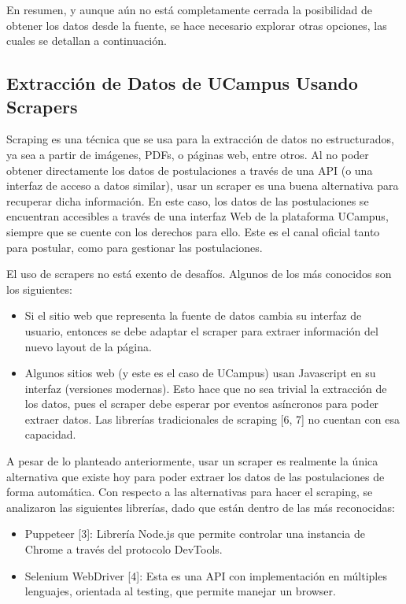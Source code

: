 En resumen, y aunque aún no está completamente cerrada la posibilidad de obtener
los datos desde la fuente, se hace necesario explorar otras opciones, las cuales
se detallan a continuación.

\subsection{Extracción de Datos de UCampus Usando Scrapers}

Scraping es una técnica que se usa para la extracción de datos no estructurados,
ya sea a partir de imágenes, PDFs, o páginas web, entre otros. Al no poder
obtener directamente los datos de postulaciones a través de una API (o una
interfaz de acceso a datos similar), usar un scraper es una buena alternativa
para recuperar dicha información. En este caso, los datos de las postulaciones
se encuentran accesibles a través de una interfaz Web de la plataforma UCampus,
siempre que se cuente con los derechos para ello. Este es el canal oficial tanto
para postular, como para gestionar las postulaciones.

El uso de scrapers no está exento de desafíos. Algunos de los más conocidos son
los siguientes: 

\begin{itemize}
    \item Si el sitio web que representa la fuente de datos cambia su interfaz
    de usuario, entonces se debe adaptar el scraper para extraer información del
    nuevo layout de la página.
    \item Algunos sitios web (y este es el caso de UCampus) usan Javascript en
    su interfaz (versiones modernas). Esto hace que no sea trivial la extracción
    de los datos, pues el scraper debe esperar por eventos asíncronos para poder
    extraer datos. Las librerías tradicionales de scraping [6, 7] no cuentan con
    esa capacidad.
\end{itemize}

A pesar de lo planteado anteriormente, usar un scraper es realmente la única
alternativa que existe hoy para poder extraer los datos de las postulaciones de
forma automática. Con respecto a las alternativas para hacer el scraping, se
analizaron las siguientes librerías, dado que están dentro de las más
reconocidas:

\begin{itemize}
    \item Puppeteer [3]: Librería Node.js que permite controlar una instancia de
    Chrome a través del protocolo DevTools.
    \item Selenium WebDriver [4]: Esta es una API con implementación en
    múltiples lenguajes, orientada al testing, que permite manejar un browser.
\end{itemize}

